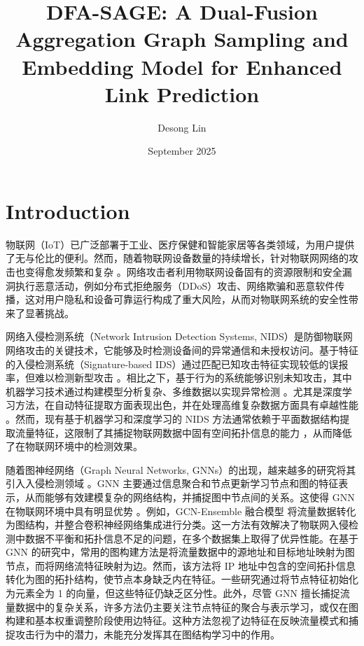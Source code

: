 \documentclass{article}
\title{DFA-SAGE: A Dual-Fusion Aggregation Graph Sampling and
Embedding Model for Enhanced Link Prediction}
\author{Desong Lin}
\date{September 2025}
\begin{document}
\maketitle

\newpage

\tableofcontents

\newpage

\section{Introduction}

物联网（IoT）已广泛部署于工业、医疗保健和智能家居等各类领域，为用户提供了无与伦比的便利。然而，随着物联网设备数量的持续增长，针对物联网网络的攻击也变得愈发频繁和复杂
\cite{7123563}。网络攻击者利用物联网设备固有的资源限制和安全漏洞执行恶意活动，例如分布式拒绝服务（DDoS）攻击、网络欺骗和恶意软件传播，这对用户隐私和设备可靠运行构成了重大风险，从而对物联网系统的安全性带来了显著挑战。

网络入侵检测系统（Network Intrusion Detection Systems,
NIDS）是防御物联网网络攻击的关键技术，它能够及时检测设备间的异常通信和未授权访问。基于特征的入侵检测系统（Signature-based
IDS）通过匹配已知攻击特征实现较低的误报率，但难以检测新型攻击
\cite{electronics9101565}。相比之下，基于行为的系统能够识别未知攻击，其中机器学习技术通过构建模型分析复杂、多维数据以实现异常检测
\cite{Hazman2023}
\cite{Al-Ambusaidi2024}。尤其是深度学习方法，在自动特征提取方面表现出色，并在处理高维复杂数据方面具有卓越性能
\cite{9796521} \cite{Hanafi2024}
\cite{Saravanan2024}。然而，现有基于机器学习和深度学习的 NIDS
方法通常依赖于平面数据结构提取流量特征，这限制了其捕捉物联网数据中固有空间拓扑信息的能力 \cite{10258187}，从而降低了在物联网环境中的检测效果。

随着图神经网络（Graph Neural Networks, GNNs）的出现，越来越多的研究将其引入入侵检测领域
\cite{ZHONG2024103821}。GNN
主要通过信息聚合和节点更新学习节点和图的特征表示，从而能够有效建模复杂的网络结构，并捕捉图中节点间的关系。这使得 GNN
在物联网环境中具有明显优势 \cite{sanchez-lengeling2021a}。例如，GCN-Ensemble 融合模型
\cite{Mittal2024}
将流量数据转化为图结构，并整合卷积神经网络集成进行分类。这一方法有效解决了物联网入侵检测中数据不平衡和拓扑信息不足的问题，在多个数据集上取得了优异性能。在基于
GNN 的研究中，常用的图构建方法是将流量数据中的源地址和目标地址映射为图节点，而将网络流特征映射为边。然而，该方法将 IP
地址中包含的空间拓扑信息转化为图的拓扑结构，使节点本身缺乏内在特征。一些研究通过将节点特征初始化为元素全为 1
的向量，但这些特征仍缺乏区分性。此外，尽管 GNN
擅长捕捉流量数据中的复杂关系，许多方法仍主要关注节点特征的聚合与表示学习，或仅在图构建和基本权重调整阶段使用边特征。这种方法忽视了边特征在反映流量模式和捕捉攻击行为中的潜力，未能充分发挥其在图结构学习中的作用。
\end{document}
